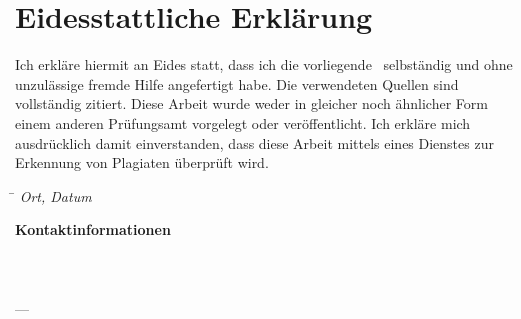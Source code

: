 
\chapter*{Eidesstattliche Erklärung}

Ich erkläre hiermit an Eides statt, dass ich die vorliegende \DocumentThesisType\ selbständig und ohne unzulässige fremde Hilfe angefertigt habe. Die verwendeten Quellen sind vollständig zitiert. Diese Arbeit wurde weder in gleicher noch ähnlicher Form einem anderen Prüfungsamt vorgelegt oder veröffentlicht. Ich erkläre mich ausdrücklich damit einverstanden, dass diese Arbeit mittels eines Dienstes zur Erkennung von Plagiaten überprüft wird.

\vspace{2cm}

\begin{tabbing}
  \hspace{6cm} \= \kill
  \textit{Ort, Datum} \> \textit{\DocumentAuthorPrename\ \DocumentAuthorName}
\end{tabbing}

\vspace{8,5cm}

\noindent
\textbf{Kontaktinformationen}\\
\DocumentAuthorPrename\ \DocumentAuthorName\\
\DocumentAuthorStreet\\
\DocumentAuthorZip\ \DocumentAuthorCity\\
---\\
\DocumentAuthorEmail
\indent